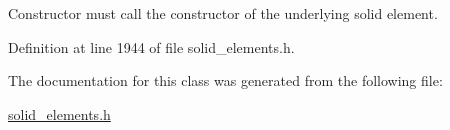 Constructor must call the constructor of the underlying solid element. 



Definition at line 1944 of file solid\+\_\+elements.\+h.



The documentation for this class was generated from the following file\+:\begin{DoxyCompactItemize}
\item 
\hyperlink{solid__elements_8h}{solid\+\_\+elements.\+h}\end{DoxyCompactItemize}
